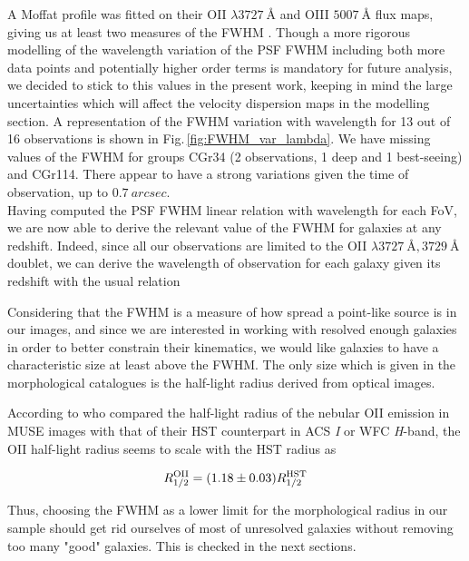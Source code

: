A Moffat profile was fitted on their OII $\lambda \SI{3727}{\angstrom}$ and OIII $\SI{5007}{\angstrom}$ flux maps, giving us at least two measures of the FWHM . Though a more rigorous modelling of the wavelength variation of the PSF FWHM including both more data points and potentially higher order terms is mandatory for future analysis, we decided to stick to this values in the present work, keeping in mind the large uncertainties which will affect the velocity dispersion maps in the modelling section. A representation of the FWHM variation with wavelength for 13 out of 16 observations is shown in Fig.\,\ref{fig:FWHM_var_lambda}. We have missing values of the FWHM for groups CGr34 (2 observations, 1 deep and 1 best-seeing) and CGr114. There appear to have a strong variations given the time of observation, up to $\SI{0.7}{arcsec}$. \\
 
Having computed the PSF FWHM  linear relation with wavelength for each FoV, we are now able to derive the relevant value of the FWHM for galaxies at any redshift. Indeed, since all our observations are limited to the OII $\lambda \SI{3727}{\angstrom}, \SI{3729}{\angstrom}$ doublet, we can derive the wavelength of observation for each galaxy given its redshift with the usual relation



Considering that the FWHM is a measure of how spread a point-like source is in our images, and since we are interested in working with resolved enough galaxies in order to better constrain their kinematics, we would like galaxies to have a characteristic size at least above the FWHM. The only size which is given in the morphological catalogues is the half-light radius derived from optical images. 

According to  who compared the half-light radius of the nebular OII emission in MUSE images with that of their HST counterpart in ACS \textit{I} or WFC \textit{H}-band, the OII half-light radius seems to scale with the HST radius as 

\begin{equation}
	R_{1/2}^{\rm{OII}} = (1.18 \pm 0.03) R_{1/2}^{\rm{HST}}
\end{equation}

Thus, choosing the FWHM as a lower limit for the morphological radius in our sample should get rid ourselves of most of unresolved galaxies without removing too many "good" galaxies. This is checked in the next sections.


